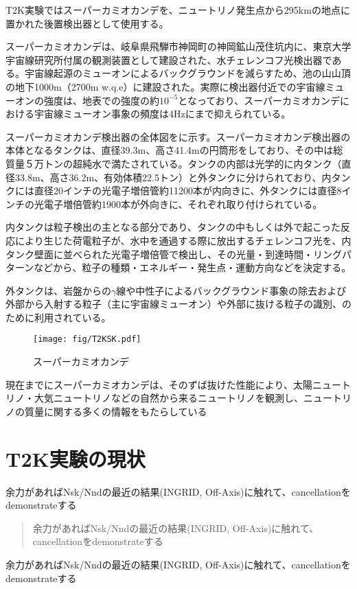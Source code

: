 T2K実験ではスーパーカミオカンデを、ニュートリノ発生点から295kmの地点に置かれた後置検出器として使用する。

スーパーカミオカンデは、岐阜県飛騨市神岡町の神岡鉱山茂住坑内に、東京大学宇宙線研究所付属の観測装置として建設された、水チェレンコフ光検出器である。宇宙線起源のミューオンによるバックグラウンドを減らすため、池の山山頂の地下1000m（2700m w.q.e）に建設された。実際に検出器付近での宇宙線ミューオンの強度は、地表での強度の約$10^{-5}$となっており、スーパーカミオカンデにおける宇宙線ミューオン事象の頻度は4Hzにまで抑えられている。

スーパーカミオカンデ検出器の全体図をに示す。スーパーカミオカンデ検出器の本体となるタンクは、直径39.3m、高さ41.4mの円筒形をしており、その中は総質量５万トンの超純水で満たされている。タンクの内部は光学的に内タンク（直径33.8m、高さ36.2m、有効体積22.5トン）と外タンクに分けられており、内タンクには直径20インチの光電子増倍管約11200本が内向きに、外タンクには直径8インチの光電子増倍管約1900本が外向きに、それぞれ取り付けられている。

内タンクは粒子検出の主となる部分であり、タンクの中もしくは外で起こった反応により生じた荷電粒子が、水中を通過する際に放出するチェレンコフ光を、内タンク壁面に並べられた光電子増倍管で検出し、その光量・到達時間・リングパターンなどから、粒子の種類・エネルギー・発生点・運動方向などを決定する。

外タンクは、岩盤からの$\gamma$線や中性子によるバックグラウンド事象の除去および外部から入射する粒子（主に宇宙線ミューオン）や外部に抜ける粒子の識別、のために利用されている。

\begin{figure}[!htb]
\centering
\texttt{[image: fig/T2KSK.pdf]}
\caption[スーパーカミオカンデ]{スーパーカミオカンデ}
\label{SuperKamiokande}
\end{figure}

現在までにスーパーカミオカンデは、そのずば抜けた性能により、太陽ニュートリノ・大気ニュートリノなどの自然から来るニュートリノを観測し、ニュートリノの質量に関する多くの情報をもたらしている

\section{T2K実験の現状}
余力があればNsk/Nndの最近の結果(INGRID, Off-Axis)に触れて、cancellationをdemonstrateする

\begin{quote}
余力があればNsk/Nndの最近の結果(INGRID, Off-Axis)に触れて、cancellationをdemonstrateする
\end{quote}

余力があればNsk/Nndの最近の結果(INGRID, Off-Axis)に触れて、cancellationをdemonstrateする
\fi